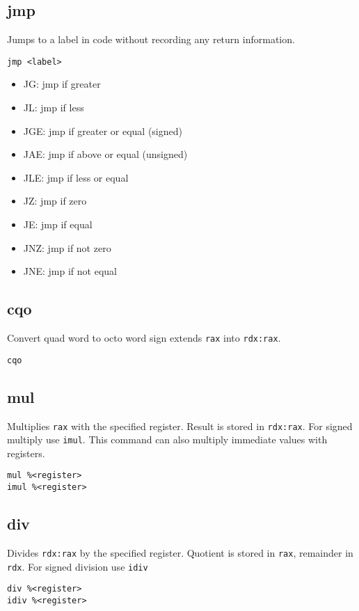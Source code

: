 \documentclass[reqno,a4paper,11pt]{amsart}
\begin{document}
\subsection{jmp}
Jumps to a label in code without recording any return information.
\begin{lstlisting}
jmp <label>
\end{lstlisting}
\begin{itemize}
    \item JG: jmp if greater
    \item JL: jmp if less
    \item JGE: jmp if greater or equal (signed)
    \item JAE: jmp if above or equal (unsigned)
    \item JLE: jmp if less or equal
    \item JZ: jmp if zero
    \item JE: jmp if equal 
    \item JNZ: jmp if not zero
    \item JNE: jmp if not equal
\end{itemize}
\subsection{cqo}
Convert quad word to octo word sign extends \texttt{rax} into \texttt{rdx:rax}.
\begin{lstlisting}
cqo
\end{lstlisting}
\subsection{mul}
Multiplies \texttt{rax} with the specified register. Result is stored in
\texttt{rdx:rax}. For signed multiply use \texttt{imul}. This command can also
multiply immediate values with registers.
\begin{lstlisting}
mul %<register>
imul %<register>
\end{lstlisting}
\subsection{div}
Divides \texttt{rdx:rax} by the specified register. Quotient is stored in
\texttt{rax}, remainder in \texttt{rdx}. For signed division use \texttt{idiv}
\begin{lstlisting}
div %<register>
idiv %<register>
\end{lstlisting}
\end{document}
